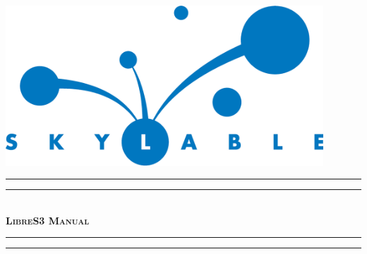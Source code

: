\documentclass[oneside,a4paper]{memoir}
\begin{document}
\pagestyle{empty}

\begin{center}
    \includegraphics[width=119mm]{logo.eps}\\
    \vspace{4cm}
    \ifpdf
    \rule{\textwidth}{1.6pt}\vspace*{-\baselineskip}\vspace*{2pt}
    \rule{\textwidth}{0.4pt}\\[\baselineskip]
    \fi
    {\fontsize{40}{50}\bfseries\scshape LibreS3 Manual}
    \ifpdf
    \rule{\textwidth}{0.4pt}\vspace*{-\baselineskip}\vspace{3.2pt}
    \rule{\textwidth}{1.6pt}\\[\baselineskip]
    \fi
\end{center}

\newpage
\tableofcontents
\vspace{1.0cm}








\end{document}
